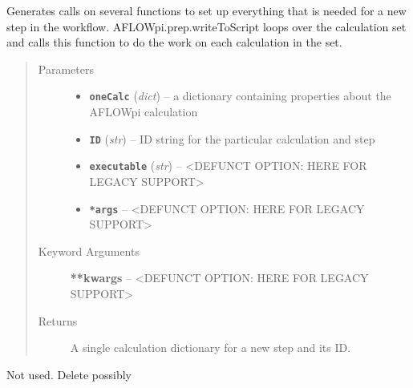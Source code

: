 \documentclass[letterpaper,10pt,english]{sphinxmanual}
\begin{document}

\begin{fulllineitems}
\label{prep:prep.__writeToScript}
Generates calls on several functions to set up everything that is
needed for a new step in the workflow. AFLOWpi.prep.writeToScript loops
over the calculation set and calls this function to do the work on
each calculation in the set.
\begin{quote}\begin{description}
\item[{Parameters}] \leavevmode\begin{itemize}
\item {} 
\textbf{\texttt{oneCalc}} (\emph{dict}) -- a dictionary containing properties about the AFLOWpi calculation

\item {} 
\textbf{\texttt{ID}} (\emph{str}) -- ID string for the particular calculation and step

\item {} 
\textbf{\texttt{executable}} (\emph{str}) -- \textless{}DEFUNCT OPTION: HERE FOR LEGACY SUPPORT\textgreater{}

\item {} 
\textbf{\texttt{*args}} -- \textless{}DEFUNCT OPTION: HERE FOR LEGACY SUPPORT\textgreater{}

\end{itemize}

\item[{Keyword Arguments}] \leavevmode
\textbf{**kwargs} --
\textless{}DEFUNCT OPTION: HERE FOR LEGACY SUPPORT\textgreater{}

\item[{Returns}] \leavevmode
A single calculation dictionary for a new step and its ID.

\end{description}\end{quote}

\end{fulllineitems}


\begin{fulllineitems}
\label{prep:prep.__write_scratch_meta_data_file}
Not used. Delete possibly

\end{fulllineitems}
\end{document}
